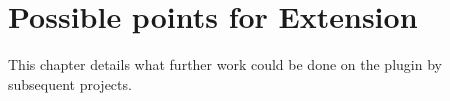 \section{Possible points for Extension} \label{extensions}
This chapter details what further work could be done on the plugin by subsequent projects.




